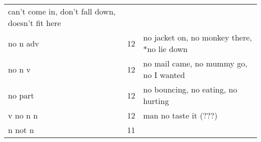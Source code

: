 \documentclass[man]{apa6}
\begin{document}
\begin{longtable}[]{@{}lll@{}}
\begin{minipage}[t]{0.47\columnwidth}
can't come in, don't fall down, doesn't fit here\strut
\end{minipage}\tabularnewline
\begin{minipage}[t]{0.23\columnwidth}\raggedright\strut
no n adv\strut
\end{minipage} & \begin{minipage}[t]{0.15\columnwidth}\raggedright\strut
12\strut
\end{minipage} & \begin{minipage}[t]{0.47\columnwidth}\raggedright\strut
no jacket on, no monkey there, *no lie down\strut
\end{minipage}\tabularnewline
\begin{minipage}[t]{0.23\columnwidth}\raggedright\strut
no n v\strut
\end{minipage} & \begin{minipage}[t]{0.15\columnwidth}\raggedright\strut
12\strut
\end{minipage} & \begin{minipage}[t]{0.47\columnwidth}\raggedright\strut
no mail came, no mummy go, no I wanted\strut
\end{minipage}\tabularnewline
\begin{minipage}[t]{0.23\columnwidth}\raggedright\strut
no part\strut
\end{minipage} & \begin{minipage}[t]{0.15\columnwidth}\raggedright\strut
12\strut
\end{minipage} & \begin{minipage}[t]{0.47\columnwidth}\raggedright\strut
no bouncing, no eating, no hurting\strut
\end{minipage}\tabularnewline
\begin{minipage}[t]{0.23\columnwidth}\raggedright\strut
v no n n\strut
\end{minipage} & \begin{minipage}[t]{0.15\columnwidth}\raggedright\strut
12\strut
\end{minipage} & \begin{minipage}[t]{0.47\columnwidth}\raggedright\strut
man no taste it (???)\strut
\end{minipage}\tabularnewline
\begin{minipage}[t]{0.23\columnwidth}\raggedright\strut
n not n\strut
\end{minipage} & \begin{minipage}[t]{0.15\columnwidth}\raggedright\strut
11\strut
\end{minipage} & \begin{minipage}[t]{0.47\columnwidth}\raggedright\strut

\end{minipage}
\end{longtable}
\end{document}
